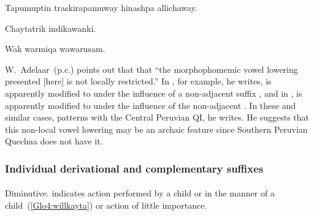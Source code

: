 %
{Tapumuptin traskirapamuway hinashpa allichaway.}%
{}%
{}{}%

%
{Chaytatrik indikawanki.}%
{}%
{}{}%

%
{Wak warmiqa wawarusam.}%
{}%
{}{}%

W.~Adelaar~(p.c.) points out that that “the morphophomemic vowel lowering presented [here] is not locally restricted.” In , for example, he writes,  is apparently modified to  under the influence of a non-adjacent suffix , and in ,  is apparently modified to  under the influence of the non-adjacent . In these and similar cases, \SYQ{} patterns with the Central Peruvian QI, he writes. He suggests that this non-local vowel lowering may be an archaic feature since Southern Peruvian Quechua does not have it.

\subsubsection{Individual derivational and complementary suffixes}\label{ssec:IDCA}
\paragraph{}
Diminutive.  indicates action performed by a child or in the manner of a child~(\ref{Glo4:willkayta}) or action of little importance.

